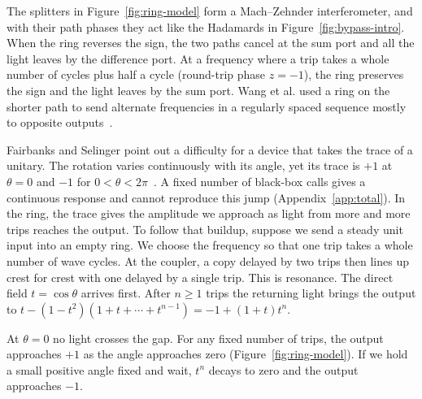 \documentclass[acmsmall,screen,review,anonymous,nonacm]{acmart}
\numberwithin{equation}{section}
\begin{document}
\begin{figure}[!htbp]
\begin{minipage}[c]{.31\linewidth}
\end{minipage}
\end{figure}

The splitters in Figure~\ref{fig:ring-model} form a Mach--Zehnder interferometer, and with their path phases they act like the Hadamards
in Figure~\ref{fig:bypass-intro}. When the ring reverses the sign, the two paths cancel at
the sum port and all the light leaves by the difference port.
At a frequency where a trip takes a whole number of cycles plus half a cycle (round-trip phase $z=-1$), the ring preserves the sign and the light leaves by the sum port.
Wang et al. used a ring on the shorter path to send alternate frequencies in a regularly spaced sequence
mostly to opposite outputs~\cite[Figs.~1 and~6]{Wang25Interleaver}.

Fairbanks and Selinger point out a difficulty for a device that takes the trace of a unitary.
The rotation varies continuously with its angle, yet its trace is $+1$ at $\theta=0$
and $-1$ for $0<\theta<2\pi$~\cite[App.~B, Remark~B.1]{FairbanksSelinger25Traces}.
A fixed number of black-box calls gives a continuous response and cannot reproduce this
jump (Appendix~\ref{app:total}). In the ring, the trace gives the amplitude we approach as
light from more and
more trips reaches the output. To follow that buildup, suppose we send a steady unit input into an empty ring. We choose the
frequency so that one trip takes a whole number of wave cycles. At the coupler,
a copy delayed by two trips then lines up crest for crest with one delayed by a single trip. This is resonance. The direct field $t=\cos\theta$
arrives first. After $n\ge1$ trips the returning light brings the output to
$t-(1-t^2)(1+t+\cdots+t^{n-1})=-1+(1+t)t^n$.

At $\theta=0$ no light crosses the gap. For any fixed number of trips, the output
approaches $+1$ as the angle approaches zero (Figure~\ref{fig:ring-model}). If we hold a
small positive angle fixed and wait, $t^n$ decays to zero and the output approaches $-1$.
\end{document}
